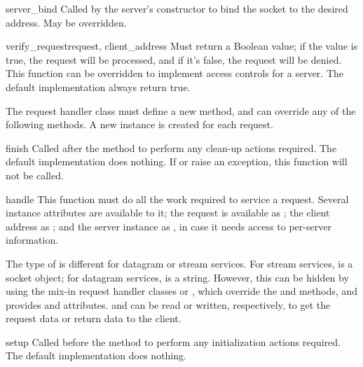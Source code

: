 \begin{funcdesc}{server_bind}{}
Called by the server's constructor to bind the socket to the desired
address.  May be overridden.
\end{funcdesc}

\begin{funcdesc}{verify_request}{request, client_address}
Must return a Boolean value; if the value is true, the request will be
processed, and if it's false, the request will be denied.
This function can be overridden to implement access controls for a server.
The default implementation always return true.
\end{funcdesc}

The request handler class must define a new  method,
and can override any of the following methods.  A new instance is
created for each request.

\begin{funcdesc}{finish}{}
Called after the  method to perform any clean-up
actions required.  The default implementation does nothing.  If
 or  raise an exception, this
function will not be called.
\end{funcdesc}

\begin{funcdesc}{handle}{}
This function must do all the work required to service a request.
Several instance attributes are available to it; the request is
available as ; the client address as
; and the server instance as
, in case it needs access to per-server
information.

The type of  is different for datagram or stream
services.  For stream services,  is a socket
object; for datagram services,  is a string.
However, this can be hidden by using the mix-in request handler
classes
 or , which
override the  and  methods, and
provides  and  attributes.
 and  can be read or written,
respectively, to get the request data or return data to the client.
\end{funcdesc}

\begin{funcdesc}{setup}{}
Called before the  method to perform any
initialization actions required.  The default implementation does
nothing.
\end{funcdesc}
